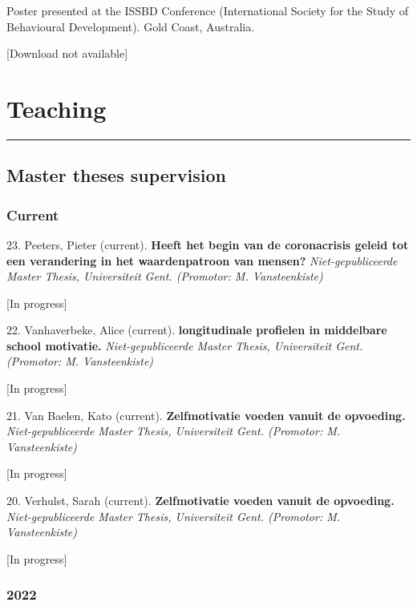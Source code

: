 \documentclass[
]{article}
\begin{document}
Poster presented at the ISSBD Conference (International Society for the
Study of Behavioural Development). Gold Coast, Australia.

{[}Download not available{]}

\hypertarget{teaching}{%
\section{\texorpdfstring{Teaching }{Teaching }}\label{teaching}}

\begin{center}\rule{0.5\linewidth}{0.5pt}\end{center}

\hypertarget{master-theses-supervision}{%
\subsection{Master theses supervision}\label{master-theses-supervision}}

\hypertarget{current}{%
\subsubsection{Current}\label{current}}

23. Peeters, Pieter (current). \textbf{Heeft het begin van de
coronacrisis geleid tot een verandering in het waardenpatroon van
mensen?} \emph{Niet-gepubliceerde Master Thesis, Universiteit Gent.
(Promotor: M. Vansteenkiste)}

{[}In progress{]}

22. Vanhaverbeke, Alice (current). \textbf{longitudinale profielen in
middelbare school motivatie.} \emph{Niet-gepubliceerde Master Thesis,
Universiteit Gent. (Promotor: M. Vansteenkiste)}

{[}In progress{]}

21. Van Baelen, Kato (current). \textbf{Zelfmotivatie voeden vanuit de
opvoeding.} \emph{Niet-gepubliceerde Master Thesis, Universiteit Gent.
(Promotor: M. Vansteenkiste)}

{[}In progress{]}

20. Verhulst, Sarah (current). \textbf{Zelfmotivatie voeden vanuit de
opvoeding.} \emph{Niet-gepubliceerde Master Thesis, Universiteit Gent.
(Promotor: M. Vansteenkiste)}

{[}In progress{]}

\hypertarget{section-6}{%
\subsubsection{2022}\label{section-6}}
\end{document}
